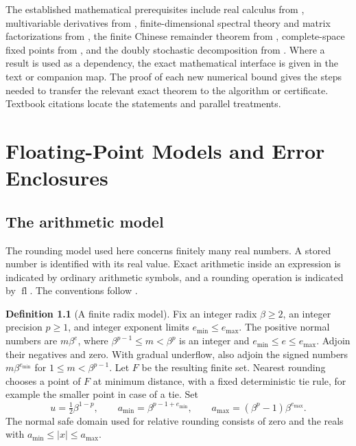 \documentclass[11pt,oneside,openany]{book}
\theoremstyle{plain}
\theoremstyle{definition}
\newtheorem{definition}[theorem]{Definition}
\theoremstyle{remark}
\begin{document}
The established mathematical prerequisites include real calculus
from \cite{d03}, multivariable derivatives from \cite{d04},
finite-dimensional spectral theory and matrix factorizations
from \cite{d05}, the finite Chinese remainder theorem from
\cite{d07}, complete-space fixed points from \cite{d10}, and
the doubly stochastic decomposition from \cite{p205}.
Where a result is used as a dependency, the exact mathematical
interface is given in the text or companion map. The proof
of each new numerical bound gives the steps needed to transfer
the relevant exact theorem to the algorithm or certificate.
Textbook citations locate the statements and parallel treatments.

\mainmatter
\chapter{Floating-Point Models and Error Enclosures}\label{p206:ch01}

\section{The arithmetic model}

The rounding model used here concerns finitely many real numbers.
A stored number is identified with its real value. Exact arithmetic
inside an expression is indicated by ordinary arithmetic symbols, and
a rounding operation is indicated by \(\operatorname{fl}\).
The conventions follow \cite[Sections 2.1--2.5]{higham}.

\begin{definition}[A finite radix model]\label{p206:W01}
Fix an integer radix \(\beta\ge2\), an integer precision \(p\ge1\),
and integer exponent limits \(e_{\min}\le e_{\max}\).
The positive normal numbers are \(m\beta^e\), where
\(\beta^{p-1}\le m<\beta^p\) is an integer and
\(e_{\min}\le e\le e_{\max}\). Adjoin their negatives and zero.
With gradual underflow, also adjoin the signed numbers
\(m\beta^{e_{\min}}\) for \(1\le m<\beta^{p-1}\).
Let \(F\) be the resulting finite set.
Nearest rounding chooses a point of \(F\) at minimum distance,
with a fixed deterministic tie rule, for example the smaller
point in case of a tie. Set
\[
 u=\tfrac12\beta^{1-p},\qquad
 a_{\min}=\beta^{p-1+e_{\min}},\qquad
 a_{\max}=(\beta^p-1)\beta^{e_{\max}}.
\]
The normal safe domain used for relative rounding consists of zero
and the reals with \(a_{\min}\le |x|\le a_{\max}\).
\end{definition}
\end{document}
